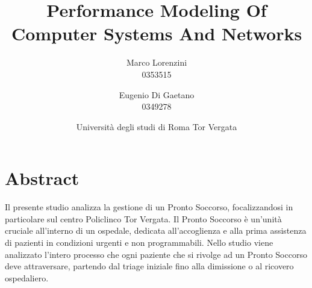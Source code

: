 \documentclass{article}
\title{Performance Modeling Of Computer Systems And Networks}
\author{
  Marco Lorenzini \\ 0353515
  \and
  Eugenio Di Gaetano \\ 0349278
}
\date{Università degli studi di Roma Tor Vergata} %
\begin{document}
\maketitle

\section{Abstract}
Il presente studio analizza la gestione di un Pronto Soccorso, focalizzandosi in particolare sul centro Policlinco Tor Vergata. Il Pronto Soccorso è un'unità cruciale all'interno di un ospedale, dedicata all'accoglienza e alla prima assistenza di pazienti in condizioni urgenti e non programmabili. Nello studio viene analizzato l'intero processo che ogni paziente che si rivolge ad un Pronto Soccorso deve attraversare, partendo dal triage iniziale fino alla dimissione o al ricovero ospedaliero.
\end{document}
